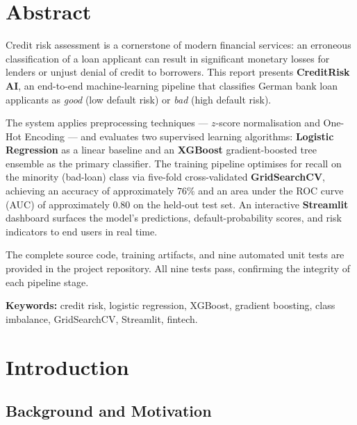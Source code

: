 \documentclass[12pt,a4paper]{article}
\theoremstyle{definition}
\begin{document}
\section*{Abstract}

Credit risk assessment is a cornerstone of modern financial services: an erroneous
classification of a loan applicant can result in significant monetary losses for
lenders or unjust denial of credit to borrowers.  This report presents
\textbf{CreditRisk AI}, an end-to-end machine-learning pipeline that classifies
German bank loan applicants as \emph{good} (low default risk) or \emph{bad}
(high default risk).

The system applies preprocessing techniques — $z$-score normalisation and
One-Hot Encoding — and evaluates two supervised learning algorithms:
\textbf{Logistic Regression} as a linear baseline and an \textbf{XGBoost}
gradient-boosted tree ensemble as the primary classifier.  The training pipeline
optimises for recall on the minority (bad-loan) class via five-fold
cross-validated \textbf{GridSearchCV}, achieving an accuracy of approximately
$76\%$ and an area under the ROC curve (AUC) of approximately $0.80$ on the
held-out test set.  An interactive \textbf{Streamlit} dashboard surfaces the
model's predictions, default-probability scores, and risk indicators to end
users in real time.

The complete source code, training artifacts, and nine automated unit tests are
provided in the project repository.  All nine tests pass, confirming the integrity
of each pipeline stage.

\textbf{Keywords:} credit risk, logistic regression, XGBoost, gradient boosting,
class imbalance, GridSearchCV, Streamlit, fintech.

\newpage

\section{Introduction}

\subsection{Background and Motivation}
\end{document}
